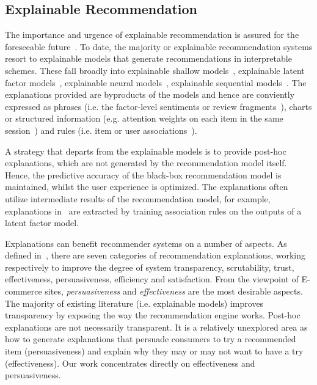 \documentclass[sigconf]{acmart}
\begin{document}
\subsection{Explainable Recommendation}
The importance and urgence of explainable recommendation is assured for the foreseeable future~\cite{Zhang2018SIGIR}. To date, the majority or explainable recommendation systems resort to explainable models that generate recommendations in interpretable schemes. These fall broadly into explainable shallow models~\cite{vig2009tagsplanations,sigurbjornsson2008flickr}, explainable latent factor models~\cite{Zhang2014Explicit,Zhang2015Daily,Wu2015FLAME}, explainable neural models~\cite{Chen2018Neural}, explainable sequential models~\cite{Chen2018Sequential}. The explanations provided are byproducts of the models and hence are conviently expressed as phrases (i.e. the factor-level sentiments or review fragments~\cite{Zhang2014Explicit,Zhang2015Daily,Wu2015FLAME}), charts or structured information (e.g. attention weights on each item in the same session~\cite{Chen2018Neural}) and rules (i.e. item or user associations~\cite{vig2009tagsplanations,sigurbjornsson2008flickr}).   


A strategy that departs from the explainable models is to provide post-hoc explanations, which are not generated by the recommendation model itself. Hence, the predictive accuracy of the black-box recommendation model is maintained, whilst the user experience is optimized. The explanations often utilize intermediate results of the recommendation model, for example, explanations in~\cite{Peake2018Explanation} are extracted by training association rules on the outputs of a latent factor model.

Explanations can benefit recommender systems on a number of aspects. As defined in~\cite{Tintarev2011Designing}, there are seven categories of recommendation explanations, working respectively to improve the degree of system transparency, scrutability, trust, effectiveness, persuasiveness, efficiency and satisfaction. 
From the viewpoint of E-commerce sites, \textit{persuasiveness} and \textit{effectiveness} are the most desirable aspects. %
The majority of existing literature (i.e. explainable models) improves transparency by exposing the way the recommendation engine works. Post-hoc explanations are not necessarily transparent. It is a relatively unexplored area as how to generate explanations that persuade consumers to try a recommended item (persuasiveness) and explain why they may or may not want to have a try (effectiveness). Our work concentrates directly on effectiveness and persuasiveness. 
\end{document}
